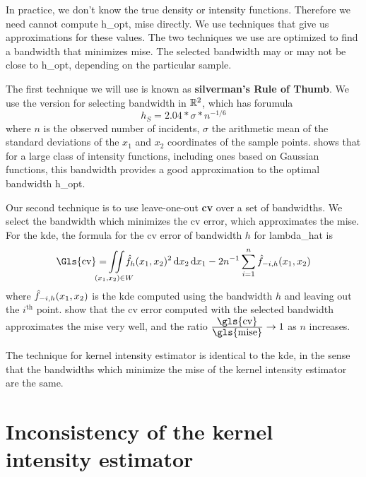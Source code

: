 In practice,
we don't know the true density or intensity functions.
Therefore we need cannot compute  \gls{h_opt},
\gls{mise} directly.
We use techniques that give us approximations for these values.
The two techniques we use are optimized to find a bandwidth that minimizes \gls{mise}.
The selected bandwidth may or may not be close to \gls{h_opt},
depending on the particular sample.

The first technique we will use is known as \textbf{\Gls{silverman}'s Rule of Thumb}.
We use the version for selecting bandwidth in $\mathbb{R}^2$,
which has forumula
\begin{equation}
    \label{eq:silverman}
    h_S = 2.04 * \sigma * n^{-1/6}%
\end{equation}
where $n$ is the observed number of incidents,
$\sigma$ the arithmetic mean of the standard deviations of the $x_1$ and $x_2$ coordinates of the sample points.
\citet{silverman1986density} shows that for a large class of intensity functions,
including ones based on Gaussian functions,
this bandwidth provides a good approximation to the optimal bandwidth \gls{h_opt}. 

Our second technique is to use leave-one-out \textbf{\gls{cv}} over a set of bandwidths.
We select the bandwidth which minimizes the \gls{cv} error,
which approximates the \gls{mise}.
For the \gls{kde}, the formula for the \gls{cv} error of bandwidth $h$ for \gls{lambda_hat} is
\begin{equation}
    \mbox{\Gls{cv}}%
        = \iintW{\hat{f}_h \xvec^2}
        - 2 n^{-1} \sum\limits_{i=1}^n \hat{f}_{-i,h}\xvec%
\end{equation}
where $\hat{f}_{-i,h}(x_1, x_2)$ is the \gls{kde} computed using the bandwidth $h$ and leaving out the $i^\text{th}$ point.
 show that the \gls{cv} error computed with the selected bandwidth approximates the \gls{mise} very well,
and the ratio $\frac{\mbox{\gls{cv}}}{\mbox{\gls{mise}}} \to 1$ as $n$ increases.

The technique for \gls{kernel intensity estimator} is identical to the \gls{kde},
in the sense that the bandwidths which minimize the \gls{mise} of the \gls{kernel intensity estimator} are the same. 

\section{Inconsistency of the kernel intensity estimator}
\label{sec:theory:inconsistency}

